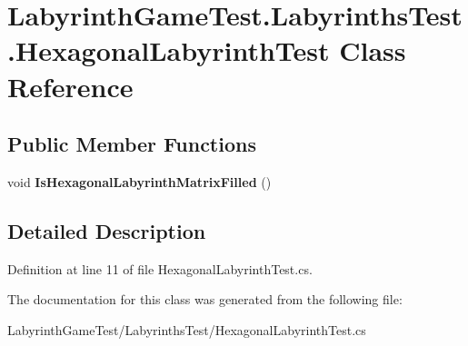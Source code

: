 \hypertarget{class_labyrinth_game_test_1_1_labyrinths_test_1_1_hexagonal_labyrinth_test}{\section{Labyrinth\+Game\+Test.\+Labyrinths\+Test.\+Hexagonal\+Labyrinth\+Test Class Reference}
\label{class_labyrinth_game_test_1_1_labyrinths_test_1_1_hexagonal_labyrinth_test}
}
\subsection*{Public Member Functions}
\begin{DoxyCompactItemize}
\item 
\hypertarget{class_labyrinth_game_test_1_1_labyrinths_test_1_1_hexagonal_labyrinth_test_aeb7ab8e1dcd18d0e9a9fa4c2265d168e}{void {\bfseries Is\+Hexagonal\+Labyrinth\+Matrix\+Filled} ()}\label{class_labyrinth_game_test_1_1_labyrinths_test_1_1_hexagonal_labyrinth_test_aeb7ab8e1dcd18d0e9a9fa4c2265d168e}

\end{DoxyCompactItemize}


\subsection{Detailed Description}


Definition at line 11 of file Hexagonal\+Labyrinth\+Test.\+cs.



The documentation for this class was generated from the following file\+:\begin{DoxyCompactItemize}
\item 
Labyrinth\+Game\+Test/\+Labyrinths\+Test/Hexagonal\+Labyrinth\+Test.\+cs\end{DoxyCompactItemize}
